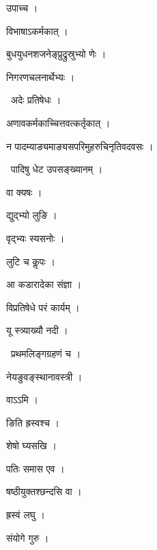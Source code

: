 \documentclass[10pt, openany, oneside]{book}
\begin{document}
\noindent उपाच्च ।

\noindent विभाषाऽकर्मकात् ।

\noindent बुधयुधनशजनेङ्प्रुद्रुस्रुभ्यो णेः ।

\noindent निगरणचलनार्थेभ्यः ।

\par\noindent\hspace{1.5em}{\vps वा॰}~{\qt अदेः प्रतिषेधः ।}

\noindent अणावकर्मकाच्चित्तवत्कर्तृकात् ।

\noindent न पादम्याङ्यमाङ्यसपरिमुहरुचिनृतिवदवसः ।

\par\noindent\hspace{1.5em}{\vps वा॰}~{\qt पादिषु धेट उपसङ्ख्यानम् ।}

\noindent वा क्यषः ।

\noindent द्युद्भ्यो लुङि ।

\noindent वृद्भ्यः स्यसनोः ।

\noindent लुटि च कॢपः ।

\noindent आ कडारादेका संज्ञा ।

\noindent विप्रतिषेधे परं कार्यम् ।

\noindent यू स्त्र्याख्यौ नदी ।

\par\noindent\hspace{1.5em}{\vps वा॰}~{\qt प्रथमलिङ्गग्रहणं च ।}

\noindent नेयङुवङ्स्थानावस्त्री ।

\noindent वाऽऽमि ।

\noindent ङिति ह्रस्वश्च ।

\noindent शेषो घ्यसखि ।

\noindent पतिः समास एव ।

\noindent षष्ठीयुक्तश्छन्दसि वा ।

\noindent ह्रस्वं लघु ।

\noindent संयोगे गुरु ।
\end{document}
